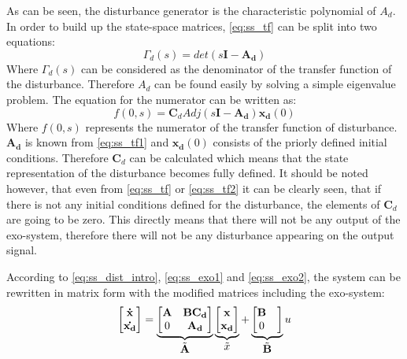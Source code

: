 As can be seen, the disturbance generator is the characteristic polynomial of $A_d$. In order to build up the state-space matrices, \eqref{eq:ss_tf} can be split into two equations:
%
\begin{equation}
  \label{eq:ss_tf1}
    \Gamma_d(s) = det(s\mathbf{I}-\mathbf{A_d}) 
  \end{equation}
%
Where $\Gamma_d(s)$ can be considered as the denominator of the transfer function of the disturbance. Therefore $A_d$ can be found easily by solving a simple eigenvalue problem. The equation for the numerator can be written as: 
%
\begin{equation}
  \label{eq:ss_tf2}
    f(0,s) = \mathbf{C}_d Adj(s\mathbf{I}-\mathbf{A_d}) \mathbf{x_d}(0)
  \end{equation}
%
Where $f(0,s)$ represents the numerator of the transfer function of disturbance. $\mathbf{A_d}$ is known from \eqref{eq:ss_tf1} and $\mathbf{x_d}(0)$ consists of the priorly defined initial conditions. Therefore $\mathbf{C}_d$ can be calculated which means that the state representation of the disturbance becomes fully defined. It should be noted however, that even from \eqref{eq:ss_tf} or \eqref{eq:ss_tf2} it can be clearly seen, that if there is not any initial conditions defined for the disturbance, the elements of $\mathbf{C}_d$ are going to be zero. This directly means that there will not be any output of the exo-system, therefore there will not be any disturbance appearing on the output signal. 

According to \eqref{eq:ss_dist_intro}, \eqref{eq:ss_exo1} and \eqref{eq:ss_exo2}, the system can be rewritten in matrix form with the modified matrices including the exo-system: 
%
\begin{equation}
\label{eq:ss_dist1}
\begin{bmatrix}
    \mathbf{\dot{x}} \\
    \mathbf{\dot{x_d}} 
\end{bmatrix}
=
\underbrace{
 \begin{bmatrix}
    \mathbf{A} & \mathbf{B}\mathbf{C_d} \\
    0 & \mathbf{A_d}
\end{bmatrix}
}_\text{\normalsize{$\tilde{\mathbf{A}}$}}
\underbrace{
 \begin{bmatrix}
    \mathbf{x} \\
    \mathbf{x_d}
\end{bmatrix}
}_\text{\normalsize{$\tilde{x}$}}
+
\underbrace{
 \begin{bmatrix}
    \mathbf{B}  \\
    0 &  
\end{bmatrix}
}_\text{\normalsize{$\tilde{\mathbf{B}}$}}
    u
\end{equation}

